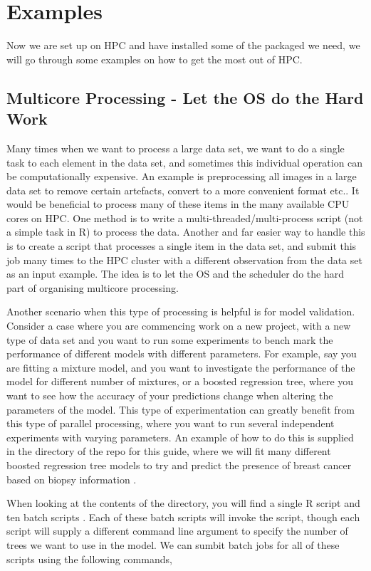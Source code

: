 \section{Examples}
Now we are set up on HPC and have installed some of the packaged we need, we will go through some examples on how to get the most out of HPC.
%
%
%
\subsection{Multicore Processing - Let the OS do the Hard Work}
%
%
Many times when we want to process a large data set, we want to do a single task to each element in the data set, and sometimes this individual operation can be computationally expensive. An example is preprocessing all images in a large data set to remove certain artefacts, convert to a more convenient format etc.. It would be beneficial to process many of these items in the many available CPU cores on HPC. One method is to write a multi-threaded/multi-process script (not a simple task in R) to process the data. Another and far easier way to handle this is to create a script that processes a single item in the data set, and submit this job many times to the HPC cluster with a different observation from the data set as an input example. The idea is to let the OS and the scheduler do the hard part of organising multicore processing.
%
%
%
\par
%
%
Another scenario when this type of processing is helpful is for model validation. Consider a case where you are commencing work on a new project, with a new type of data set and you want to run some experiments to bench mark the performance of different models with different parameters. For example, say you are fitting a mixture model, and you want to investigate the performance of the model for different number of mixtures, or a boosted regression tree, where you want to see how the accuracy of your predictions change when altering the parameters of the model. This type of experimentation can greatly benefit from this type of parallel processing, where you want to run several independent experiments with varying parameters. An example of how to do this is supplied in the  directory of the repo for this guide, where we will fit many different boosted regression tree models to try and predict the presence of breast cancer based on biopsy information \cite{breast}.
%
%
%
\par
%
%
When looking at the contents of the  directory, you will find a single R script  and ten batch scripts . Each of these batch scripts will invoke the  script, though each script will supply a different command line argument to specify the number of trees we want to use in the model. We can sumbit batch jobs for all of these scripts using the following commands,
